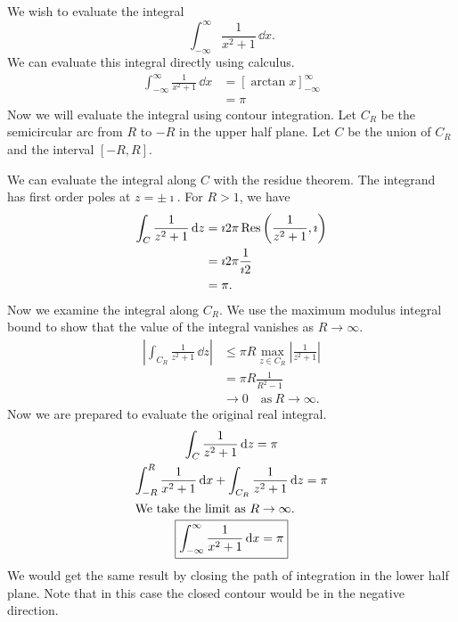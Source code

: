\begin{Example}
  \label{ci_1ox2p1}
  We wish to evaluate the integral
  \[
  \int_{-\infty}^\infty \frac{1}{x^2+1} \,\dd x.
  \]
  We can evaluate this integral directly using calculus.
  \begin{align*}
    \int_{-\infty}^\infty \frac{1}{x^2+1} \,\dd x
    &= \left[ \arctan x \right]_{-\infty}^\infty \\
    &= \pi
  \end{align*}
  Now we will evaluate the integral using contour integration.
  Let $C_R$ be the semicircular arc from $R$ to $-R$ in the upper half plane.
  Let $C$ be the union of $C_R$ and the interval $[-R,R]$.  

  We can evaluate the integral along $C$ with the residue theorem.
  The integrand has first order poles at $z = \pm \imath$.
  For  $R > 1$, we have
  \begin{align*}
    \int_C \frac{1}{z^2+1} \,\mathrm{d} z
    &= \imath 2 \pi \mathop{\mathrm{Res}}\nolimits\left( \frac{1}{z^2+1}, \imath \right) \\
    &= \imath 2 \pi \frac{1}{\imath 2} \\
    &= \pi.
  \end{align*}
  Now we examine the integral along $C_R$.
  We use the maximum modulus integral bound to show that the value of the 
  integral vanishes as $R \to \infty$.
  \begin{align*}
    \left| \int_{C_R} \frac{1}{z^2+1} \,\dd z \right|
    &\leq \pi R \max_{z \in C_R} \left| \frac{1}{z^2+1} \right| \\
    &= \pi R \frac{1}{R^2-1} \\
    &\to 0 \quad \mathrm{as}\ R \to \infty.
  \end{align*}
  Now we are prepared to evaluate the original real integral.
  \begin{gather*}
    \int_C \frac{1}{z^2+1} \,\mathrm{d} z = \pi \\
    \int_{-R}^R \frac{1}{x^2 + 1} \,\mathrm{d} x +
    \int_{C_R} \frac{1}{z^2+1} \,\mathrm{d} z = \pi \\
    \intertext{We take the limit as $R \to \infty$.}
    \boxed{
      \int_{-\infty}^\infty \frac{1}{x^2 + 1} \,\mathrm{d} x = \pi
      }
  \end{gather*}
  We would get the same result by closing the path of integration in 
  the lower half plane.  Note that in this case the closed contour would
  be in the negative direction.
\end{Example}




